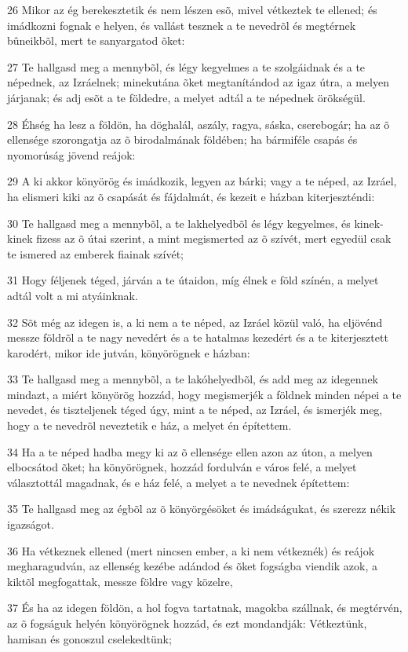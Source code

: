 \par 26 Mikor az ég berekesztetik és nem lészen esõ, mivel vétkeztek te ellened; és imádkozni fognak e helyen, és vallást tesznek a te nevedrõl és megtérnek bûneikbõl, mert te sanyargatod õket:
\par 27 Te hallgasd meg a mennybõl, és légy kegyelmes a te szolgáidnak és a te népednek, az Izráelnek; minekutána õket megtanítándod az igaz útra, a melyen járjanak; és adj esõt a te földedre, a melyet adtál a te népednek örökségül.
\par 28 Éhség ha lesz a földön, ha döghalál, aszály, ragya, sáska, cserebogár; ha az õ ellensége  szorongatja az õ birodalmának földében; ha bármiféle csapás és nyomorúság jövend reájok:
\par 29 A ki akkor könyörög és imádkozik, legyen az bárki; vagy a te néped, az Izráel, ha elismeri kiki az õ csapását és fájdalmát, és kezeit e házban kiterjeszténdi:
\par 30 Te hallgasd meg a mennybõl, a te lakhelyedbõl és légy kegyelmes, és kinek-kinek fizess az õ útai szerint, a mint megismerted az õ szívét, mert egyedül csak te ismered az emberek fiainak szívét;
\par 31 Hogy féljenek téged, járván a te útaidon, míg élnek e föld színén, a melyet adtál volt a mi atyáinknak.
\par 32 Sõt még az idegen is, a ki nem a te néped, az Izráel közül való, ha eljövénd messze földrõl a te nagy nevedért és a te hatalmas kezedért és a te kiterjesztett karodért, mikor ide jutván, könyörögnek e házban:
\par 33 Te hallgasd meg a mennybõl, a te lakóhelyedbõl, és add meg az idegennek mindazt, a miért könyörög hozzád, hogy megismerjék a földnek minden népei a te nevedet, és tiszteljenek téged úgy, mint a te néped, az Izráel, és ismerjék meg, hogy a te nevedrõl neveztetik e ház, a melyet én építettem.
\par 34 Ha a te néped hadba megy ki az õ ellensége ellen azon az úton, a melyen elbocsátod õket; ha könyörögnek, hozzád fordulván e város felé, a melyet választottál magadnak, és e ház felé, a melyet a te nevednek építettem:
\par 35 Te hallgasd meg az égbõl az õ könyörgésöket és imádságukat, és szerezz nékik igazságot.
\par 36 Ha vétkeznek ellened (mert nincsen ember, a ki nem vétkeznék) és reájok megharagudván, az ellenség kezébe adándod és õket fogságba viendik azok, a kiktõl megfogattak, messze földre vagy közelre,
\par 37 És ha az idegen földön, a hol fogva tartatnak, magokba szállnak, és megtérvén, az õ fogságuk helyén könyörögnek hozzád, és ezt mondandják: Vétkeztünk, hamisan és gonoszul cselekedtünk;
